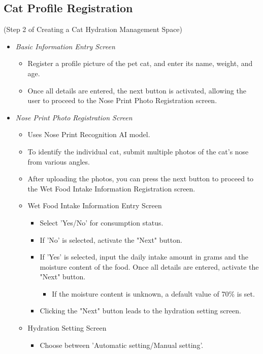 \documentclass[conference]{IEEEtran}
\begin{document}
\subsection{Cat Profile Registration}
(Step 2 of Creating a Cat Hydration Management Space)
\begin{itemize}
\item{\emph{Basic Information Entry Screen}}
    \begin{itemize}
        \item Register a profile picture of the pet cat, and enter its name, weight, and age.
        \item Once all details are entered, the next button is activated, allowing the user to proceed to the Nose Print Photo Registration screen.
    \end{itemize}
\item{\emph{Nose Print Photo Registration Screen}}
    \begin{itemize}
        \item Uses Nose Print Recognition AI model.
        \item To identify the individual cat, submit multiple photos of the cat's nose from various angles.
        \item After uploading the photos, you can press the next button to proceed to the Wet Food Intake Information Registration screen.
        \item Wet Food Intake Information Entry Screen
        \begin{itemize}
            \item Select 'Yes/No' for consumption status.
            \item If 'No' is selected, activate the "Next" button.
            \item If 'Yes' is selected, input the daily intake amount in grams and the moisture content of the food. Once all details are entered, activate the "Next" button.
            \begin{itemize}
                \item If the moisture content is unknown, a default value of 70\% is set.
            \end{itemize}
            \item Clicking the "Next" button leads to the hydration setting screen.
        \end{itemize}
        \item Hydration Setting Screen
        \begin{itemize}
            \item Choose between 'Automatic setting/Manual setting'.

\end{itemize}
\end{itemize}
\end{itemize}
\end{document}
